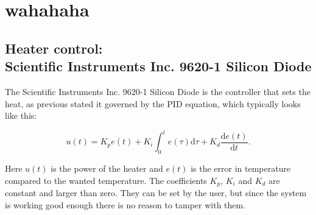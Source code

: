 \documentclass[a4paper,12pt]{article}
\begin{document}
\section{wahahaha}

\subsection{Heater control: \\ Scientific Instruments Inc. 9620-1 Silicon Diode}
The Scientific Instruments Inc. 9620-1 Silicon Diode is the controller that sets the heat, as previous stated it governed by the PID equation, which typically looks like this:

\begin{equation}
u(t)= K_pe(t) + K_i\int_0^t \! e(\tau)\mathrm{d}\tau + K_d\frac{\mathrm{d}e(t)}{\mathrm{d}t}.
\label{eq:PID}
\end{equation}

\noindent Here $u(t)$ is the power of the heater and $e(t)$ is the error in temperature compared to the wanted temperature. The coefficients $K_p$, $K_i$ and $K_d$ are constant and larger than zero. They can be set by the user, but since the system is working good enough there is no reason to tamper with them. 


%
%


\end{document}
